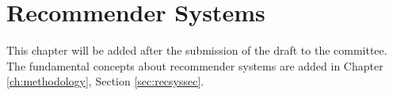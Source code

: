 \chapter{Recommender Systems}
\label{ch:recsys}

    This chapter will be added after the submission of the draft to the committee. The fundamental concepts about recommender systems are added in Chapter \ref{ch:methodology}, Section \ref{sec:recsyssec}.

